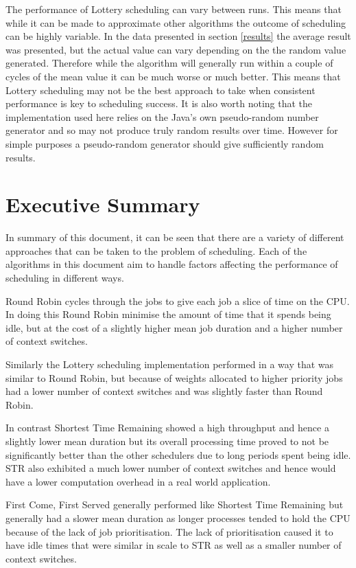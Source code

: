 \documentclass{acm_proc_article-sp}
\begin{document}
The performance of Lottery scheduling can vary between runs. This means that while it can be made to approximate other algorithms the outcome of scheduling can be highly variable. In the data presented in section \ref{results} the average result was presented, but the actual value can vary depending on the the random value generated. Therefore while the algorithm will generally run within a couple of cycles of the mean value it can be much worse or much better. This means that Lottery scheduling may not be the best approach to take when consistent performance is key to scheduling success. It is also worth noting that the implementation used here relies on the Java's own pseudo-random number generator and so may not produce truly random results over time. However for simple purposes a pseudo-random generator should give sufficiently random results.

\section{Executive Summary}
In summary of this document, it can be seen that there are a variety of different approaches that can be taken to the problem of scheduling. Each of the algorithms in this document aim to handle factors affecting the performance of scheduling in different ways. 

Round Robin cycles through the jobs to give each job a slice of time on the CPU. In doing this Round Robin minimise the amount of time that it spends being idle, but at the cost of a slightly higher mean job duration and a higher number of context switches.

Similarly the Lottery scheduling implementation performed in a way that was similar to Round Robin, but because of weights allocated to higher priority jobs had a lower number of context switches and was slightly faster than Round Robin. 

In contrast Shortest Time Remaining showed a high throughput and hence a slightly lower mean duration but its overall processing time proved to not be significantly better than the other schedulers due to long periods spent being idle. STR also exhibited a much lower number of context switches and hence would have a lower computation overhead in a real world application.

First Come, First Served generally performed like Shortest Time Remaining but generally had a slower mean duration as longer processes tended to hold the CPU because of the lack of job prioritisation. The lack of prioritisation caused it to have idle times that were similar in scale to STR as well as a smaller number of context switches.
\end{document}
